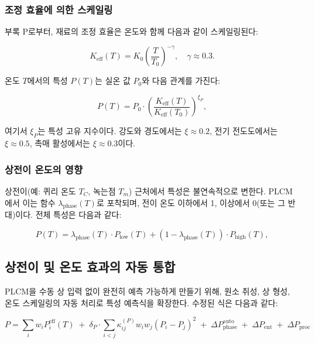 \documentclass[12pt,a4paper]{article}
\newcommand{\Keff}{K_{\mathrm{eff}}}
\begin{document}
	\subsubsection{조정 효율에 의한 스케일링}
	부록 P로부터, 재료의 조정 효율은 온도와 함께 다음과 같이 스케일링된다:
	
	\begin{equation}
		\Keff(T) = K_0 \left( \frac{T}{T_0} \right)^{-\gamma}, \quad \gamma \approx 0.3.
		\label{eq:keff-T}
	\end{equation}
	
	온도 \(T\)에서의 특성 \(P(T)\)는 실온 값 \(P_0\)와 다음 관계를 가진다:
	
	\begin{equation}
		P(T) = P_0 \cdot \left( \frac{\Keff(T)}{\Keff(T_0)} \right)^{\xi_P},
		\label{eq:property-T-scaling}
	\end{equation}
	
	여기서 \(\xi_P\)는 특성 고유 지수이다. 강도와 경도에서는 \(\xi \approx 0.2\), 전기 전도도에서는 \(\xi \approx 0.5\), 촉매 활성에서는 \(\xi \approx 0.3\)이다.
	
	\subsubsection{상전이 온도의 영향}
	상전이(예: 퀴리 온도 \(T_C\), 녹는점 \(T_m\)) 근처에서 특성은 불연속적으로 변한다. PLCM에서 이는 함수 \(\lambda_{\text{phase}}(T)\)로 포착되며, 전이 온도 이하에서 1, 이상에서 0(또는 그 반대)이다. 전체 특성은 다음과 같다:
	
	\begin{equation}
		P(T) = \lambda_{\text{phase}}(T) \cdot P_{\text{low}}(T) + (1-\lambda_{\text{phase}}(T)) \cdot P_{\text{high}}(T),
		\label{eq:phase-transition}
	\end{equation}
	
	\subsection{상전이 및 온도 효과의 자동 통합}
	\label{subsec:auto-phase}
	
	PLCM을 수동 상 입력 없이 완전히 예측 가능하게 만들기 위해, 원소 취성, 상 형성, 온도 스케일링의 자동 처리로 특성 예측식을 확장한다. 수정된 식은 다음과 같다:
	
	\begin{equation}
		\boxed{
			P = \sum_i w_i P_i^{\text{eff}}(T) \;+\; \delta_P \cdot \sum_{i<j} \kappa_{ij}^{(P)} w_i w_j (P_i - P_j)^2 \;+\; \Delta P_{\text{phase}}^{\text{auto}} \;+\; \Delta P_{\text{ent}} \;+\; \Delta P_{\text{proc}}
		}
		\label{eq:plcm-auto}
	\end{equation}
	
\end{document}
